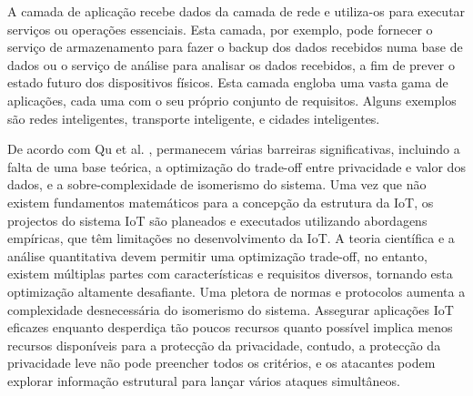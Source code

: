 \documentclass[conference]{IEEEtran}
\begin{document}

A camada de aplicação recebe dados da camada de rede e utiliza-os para
executar serviços ou operações essenciais. Esta camada, por exemplo,
pode fornecer o serviço de armazenamento para fazer o backup dos dados
recebidos numa base de dados ou o serviço de análise para analisar os
dados recebidos, a fim de prever o estado futuro dos dispositivos físicos.
Esta camada engloba uma vasta gama de aplicações, cada uma com o seu
próprio conjunto de requisitos. Alguns exemplos são redes inteligentes,
transporte inteligente, e cidades inteligentes.


De acordo com Qu et al. \cite{Qu2018Privacy}, permanecem várias barreiras
significativas, incluindo a falta de uma base teórica, a optimização do
trade-off entre privacidade e valor dos dados, e a sobre-complexidade de
isomerismo do sistema. Uma vez que não existem fundamentos matemáticos para
a concepção da estrutura da IoT, os projectos do sistema IoT são planeados
e executados utilizando abordagens empíricas, que têm limitações no desenvolvimento
da IoT. A teoria científica e a análise quantitativa devem permitir uma optimização
trade-off, no entanto, existem múltiplas partes com características e requisitos
diversos, tornando esta optimização altamente desafiante. Uma pletora de normas
e protocolos aumenta a complexidade desnecessária do isomerismo do sistema.
Assegurar aplicações IoT eficazes enquanto desperdiça tão poucos recursos
quanto possível implica menos recursos disponíveis para a protecção da
privacidade, contudo, a protecção da privacidade leve não pode preencher
todos os critérios, e os atacantes podem explorar informação estrutural
para lançar vários ataques simultâneos.
\end{document}
